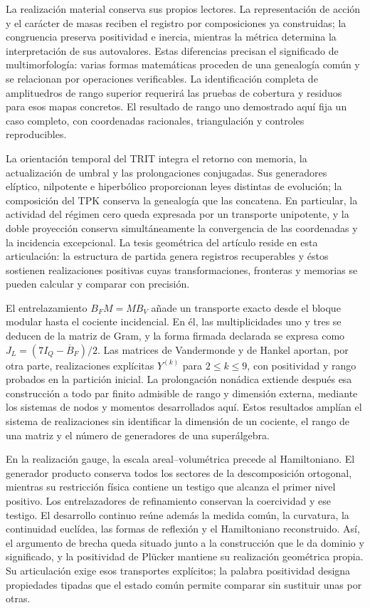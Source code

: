 \documentclass[a4paper,10pt]{article}
\theoremstyle{definition}\newtheorem{definition}[theorem]{Definición}
\theoremstyle{remark}\newtheorem{remark}[theorem]{Observación}
\numberwithin{equation}{section}
\begin{document}
La realización material conserva sus propios lectores. La representación de
acción y el carácter de masas reciben el registro por composiciones ya
construidas; la congruencia preserva positividad e inercia, mientras la
métrica determina la interpretación de sus autovalores. Estas diferencias
precisan el significado de multimorfología: varias formas matemáticas
proceden de una genealogía común y se relacionan por operaciones verificables.
La identificación completa de amplituedros de rango superior requerirá
las pruebas de cobertura y residuos para esos mapas concretos. El resultado
de rango uno demostrado aquí fija un caso completo, con coordenadas
racionales, triangulación y controles reproducibles.

La orientación temporal del TRIT integra el retorno con memoria, la
actualización de umbral y las prolongaciones conjugadas. Sus generadores
elíptico, nilpotente e hiperbólico proporcionan leyes distintas de
evolución; la composición del TPK conserva la genealogía que las
concatena. En particular, la actividad del régimen cero queda expresada
por un transporte unipotente, y la doble proyección conserva simultáneamente
la convergencia de las coordenadas y la incidencia excepcional. La tesis
geométrica del artículo reside en esta articulación: la estructura de
partida genera registros recuperables y éstos sostienen realizaciones
positivas cuyas transformaciones, fronteras y memorias se pueden calcular
y comparar con precisión.

El entrelazamiento \(B_FM=MB_V\) añade un transporte exacto desde el
bloque modular hasta el cociente incidencial. En él, las multiplicidades
uno y tres se deducen de la matriz de Gram, y la forma firmada declarada
se expresa como \(J_L=(7I_Q-\overline B_F)/2\). Las matrices de
Vandermonde y de Hankel aportan, por otra parte, realizaciones explícitas
\(Y^{(k)}\) para \(2\le k\le9\), con positividad y rango probados
en la partición inicial. La prolongación nonádica extiende después
esa construcción a todo par finito admisible de rango y dimensión
externa, mediante los sistemas de nodos y momentos desarrollados aquí.
Estos resultados amplían el sistema de realizaciones sin identificar
la dimensión de un cociente, el rango de una matriz y el número de
generadores de una superálgebra.

En la realización gauge, la escala areal--volumétrica precede al
Hamiltoniano. El generador producto conserva todos los sectores de la
descomposición ortogonal, mientras su restricción física contiene un
testigo que alcanza el primer nivel positivo. Los entrelazadores de
refinamiento conservan la coercividad y ese testigo. El desarrollo
continuo reúne además la medida común, la curvatura, la continuidad
euclídea, las formas de reflexión y el Hamiltoniano reconstruido. Así,
el argumento de brecha queda situado junto a la construcción que le da
dominio y significado, y la positividad de Plücker mantiene su realización
geométrica propia. Su articulación exige esos transportes explícitos;
la palabra positividad designa propiedades tipadas que el estado común
permite comparar sin sustituir unas por otras.
\end{document}
